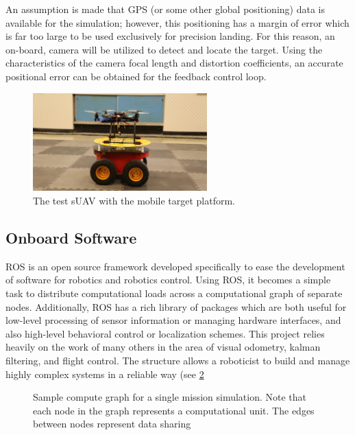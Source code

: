 An assumption is made that GPS (or some other global positioning) data is available for the simulation;
however, this positioning has a margin of error which is far too large to be used exclusively for precision
landing. For this reason, an on-board, camera will be utilized to detect and locate the target. Using
the characteristics of the camera focal length and distortion coefficients, an accurate positional error can
be obtained for the feedback control loop. 

\begin{figure}[h]
    \centering
    \includegraphics[width=0.6\textwidth]{images/irols.jpg}
    \caption{The test sUAV with the mobile target platform.}\label{f:lezl-olli}
\end{figure}

\subsection{Onboard Software}
ROS is an open source framework developed specifically to ease the development of software for robotics and
robotics control\cite{quigley2009ros}. Using ROS, it becomes a simple task to distribute computational loads
across a computational graph of separate nodes. Additionally, ROS has a rich library of packages which are
both useful for low-level processing of sensor information or managing hardware interfaces, and also
high-level behavioral control or localization schemes. This project relies heavily on the work of many others
in the area of visual odometry\cite{olson2011tags}, kalman filtering\cite{MooreStouchKeneralizedEkf2014}, and
flight control\cite{rotors:2016,meier2015px4}. The structure allows a roboticist to build and manage highly
complex systems in a reliable way (see \cref{f:rosgraph}

\begin{figure}[ht]
    \centering
    \caption{Sample compute graph for a single mission simulation. Note that each node in the graph represents
    a computational unit. The edges between nodes represent data sharing}\label{f:rosgraph}
\end{figure}

